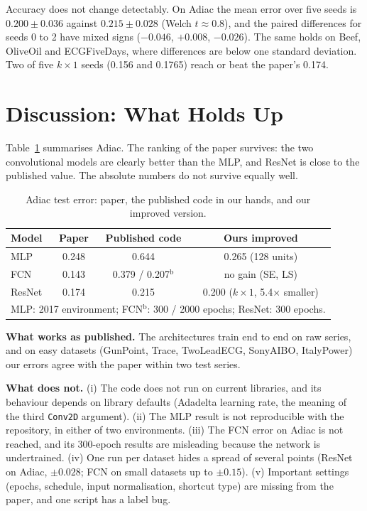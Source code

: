 \documentclass[conference]{IEEEtran}
\begin{document}
Accuracy does not change detectably. On Adiac the mean error over five seeds is $0.200\pm0.036$ against $0.215\pm0.028$ (Welch $t\approx0.8$), and the paired differences for seeds 0 to 2 have mixed signs ($-0.046$, $+0.008$, $-0.026$). The same holds on Beef, OliveOil and ECGFiveDays, where differences are below one standard deviation. Two of five $k\times1$ seeds (0.156 and 0.1765) reach or beat the paper's 0.174.

\section{Discussion: What Holds Up}
Table~\ref{tab:summary} summarises Adiac. The ranking of the paper survives: the two convolutional models are clearly better than the MLP, and ResNet is close to the published value. The absolute numbers do not survive equally well.

\begin{table}[htbp]
\caption{Adiac test error: paper, the published code in our hands, and our improved version.}
\begin{center}
\footnotesize
\setlength{\tabcolsep}{3pt}
\begin{tabular}{|l|c|c|c|}
\hline
\textbf{Model} & \textbf{Paper} & \textbf{Published code} & \textbf{Ours improved} \\
\hline
MLP & 0.248 & 0.644 & 0.265 (128 units) \\
FCN & 0.143 & 0.379 / 0.207$^{\mathrm{b}}$ & no gain (SE, LS) \\
ResNet & 0.174 & 0.215 & 0.200 ($k\times1$, 5.4$\times$ smaller) \\
\hline
\multicolumn{4}{l}{\scriptsize MLP: 2017 environment; FCN$^{\mathrm{b}}$: 300 / 2000 epochs; ResNet: 300 epochs.}
\end{tabular}
\label{tab:summary}
\end{center}
\end{table}

\textbf{What works as published.} The architectures train end to end on raw series, and on easy datasets (GunPoint, Trace, TwoLeadECG, SonyAIBO, ItalyPower) our errors agree with the paper within two test series.

\textbf{What does not.} (i) The code does not run on current libraries, and its behaviour depends on library defaults (Adadelta learning rate, the meaning of the third \texttt{Conv2D} argument). (ii) The MLP result is not reproducible with the repository, in either of two environments. (iii) The FCN error on Adiac is not reached, and its 300-epoch results are misleading because the network is undertrained. (iv) One run per dataset hides a spread of several points (ResNet on Adiac, $\pm0.028$; FCN on small datasets up to $\pm0.15$). (v) Important settings (epochs, schedule, input normalisation, shortcut type) are missing from the paper, and one script has a label bug.
\end{document}
